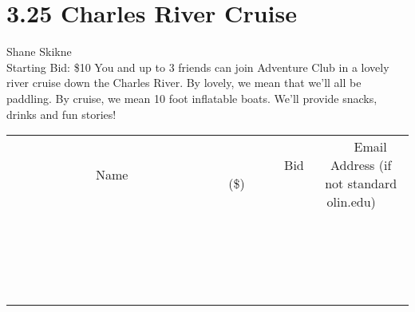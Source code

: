 \documentclass[11pt]{article}
\begin{document}
\section*{3.25 Charles River Cruise}
Shane Skikne
\\
Starting Bid: \$10
\newline
You and up to 3 friends can join Adventure Club in a lovely river cruise down the Charles River. By lovely, we mean that we'll all be paddling. By cruise, we mean 10 foot inflatable boats. We'll provide snacks, drinks and fun stories!
\\[3ex]
\begin{tabular}{c c c}
~~~~~~~~~~~~~Name~~~~~~~~~~~~~ & ~~~~~~~~~Bid (\$)~~~~~~~~~  & ~~~Email Address (if not standard olin.edu)~~~\\
 & & \\
\hline
 & & \\
\hline
 & & \\
\hline
 & & \\
\hline
 & & \\
\hline
 & & \\
\hline
 & & \\
\hline
 & & \\
\hline
 & & \\
\hline
 & & \\
\hline
 & & \\
\hline
 & & \\
\hline
 & & \\
\hline
 & & \\
\hline
 & & \\
\hline
 & & \\
\hline
 & & \\
\hline
 & & \\
\hline
 & & \\
\hline
\end{tabular}
\newpage
\end{document}
